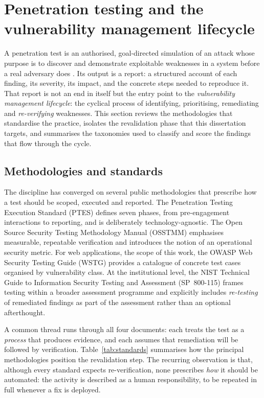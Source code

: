 \section{Penetration testing and the vulnerability management lifecycle}
\label{sec:pentest-lifecycle}

A penetration test is an authorised, goal-directed simulation of an attack whose
purpose is to discover and demonstrate exploitable weaknesses in a system before a
real adversary does \cite{nist80015}. Its output is a report: a structured
account of each finding, its severity, its impact, and the concrete steps needed
to reproduce it. That report is not an end in itself but the entry point to the
\emph{vulnerability management lifecycle}: the cyclical process of
identifying, prioritising, remediating and \emph{re-verifying}
weaknesses. This section reviews the methodologies that standardise the practice,
isolates the revalidation phase that this dissertation targets, and summarises the
taxonomies used to classify and score the findings that flow through the cycle.

\subsection{Methodologies and standards}
\label{subsec:methodologies}

The discipline has converged on several public methodologies that prescribe how a
test should be scoped, executed and reported. The Penetration Testing Execution
Standard (PTES) \cite{ptes} defines seven phases, from pre-engagement interactions
to reporting, and is deliberately technology-agnostic. The Open Source Security
Testing Methodology Manual (OSSTMM) \cite{osstmm} emphasises measurable, repeatable
verification and introduces the notion of an operational security metric. For web
applications, the scope of this work, the OWASP Web Security Testing Guide
(WSTG) \cite{owasp_wstg} provides a catalogue of concrete test cases organised by
vulnerability class. At the institutional level, the NIST Technical Guide to
Information Security Testing and Assessment (SP~800-115) \cite{nist80015} frames
testing within a broader assessment programme and explicitly includes
\emph{re-testing} of remediated findings as part of the assessment rather than an
optional afterthought.

A common thread runs through all four documents: each treats the test as a
\emph{process} that produces evidence, and each assumes that remediation will be
followed by verification. Table~\ref{tab:standards} summarises how the principal
methodologies position the revalidation step. The recurring observation is that,
although every standard expects re-verification, none prescribes \emph{how} it
should be automated: the activity is described as a human responsibility, to be
repeated in full whenever a fix is deployed.

